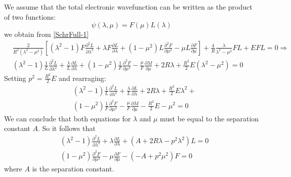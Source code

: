 We assume that the total electronic wavefunction can be written as the product of two functions:
\begin{equation}\label{variables2C}
\psi(\lambda,\mu) = F(\mu)L(\lambda)
\end{equation}
we obtain from \eqref{SchrFull-1}
\begin{equation}
\begin{split}
& \frac{2}{ R^2 (\lambda^2-\mu^2) }\left[(\lambda^2-1)F\frac{\partial^2 L}{\partial \lambda^2} + \lambda F\frac{\partial L}{\partial \lambda} + 
(1 - \mu^2)L\frac{\partial^2 F}{\partial \mu^2} - \mu L\frac{\partial F}{\partial \mu} \right] + \frac{4}{R}\frac{\lambda}{\lambda^2-\mu^2} F L + E F L = 0 \Rightarrow \\[.8em]
& (\lambda^2-1)\frac{1}{L}\frac{\partial^2 L}{\partial \lambda^2} + \frac{\lambda}{L}\frac{\partial L}{\partial \lambda} + 
(1 - \mu^2)\frac{1}{F}\frac{\partial^2 F}{\partial \mu^2} - \frac{\mu}{F} \frac{\partial M}{\partial \mu} + 2R\lambda + \frac{R^2}{2} E (\lambda^2 - \mu^2) = 0 
\end{split}
\end{equation}
Setting $ p^2 = \frac{R^2}{2}E $ and rearraging: \\[1.em]
\begin{equation}\label{eqLG}
\begin{split}
& (\lambda^2-1)\frac{1}{L}\frac{\partial^2 L}{\partial \lambda^2} + \frac{\lambda}{L}\frac{\partial L}{\partial \lambda} + 2R\lambda + \frac{R^2}{2} E \lambda^2 + \\[.8em]
& (1 - \mu^2)\frac{1}{F}\frac{\partial^2 F}{\partial \mu^2} - \frac{\mu}{F} \frac{\partial M}{\partial \mu} - \frac{R^2}{2} E - \mu^2 = 0
\end{split}
\end{equation}
We can conclude that both equations for $ \lambda $ and $ \mu $ must be equal to the separation constant $ A $. So it follows that
\begin{equation}\label{eqLG}
\begin{split}
& (\lambda^2-1)\frac{\partial^2 L}{\partial \lambda^2} + \lambda\frac{\partial L}{\partial \lambda} + \left(A + 2R\lambda - p^2 \lambda^2\right) L = 0 \\[.8em]
& (1 - \mu^2)\frac{\partial^2 F}{\partial \mu^2} - \mu\frac{\partial F}{\partial \mu} - \left(-A + p^2 \mu^2\right) F = 0
\end{split}
\end{equation}
where $ A $ is the separation constant.

